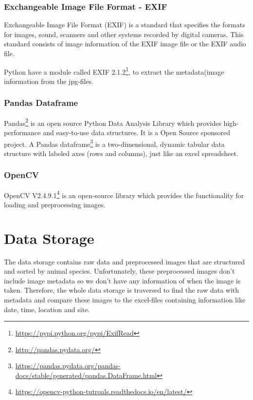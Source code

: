 \documentclass[USenglish]{uit-thesis}
\begin{document}
\subsubsection{Exchangeable Image File Format - EXIF} \label{sssec:imp_exif}
Exchangeable Image File Format (EXIF) is a standard that specifies the formats for images, sound, scanners and other systems recorded by digital cameras. This standard consists of image information of the EXIF image file or the EXIF audio file.

Python have a module called  EXIF 2.1.2\footnote{\url{https://pypi.python.org/pypi/ExifRead}}, to extract the metadata(image information from the jpg-files.

\subsubsection{Pandas Dataframe} \label{sssec:imp_df}
Pandas\footnote{\url{http://pandas.pydata.org/}} is an open source Python Data Analysis Library which provides high-performance and easy-to-use data structures. It is a Open Source sponsored project. A Pandas dataframe\footnote{\url{https://pandas.pydata.org/pandas-docs/stable/generated/pandas.DataFrame.html}} is a two-dimensional, dynamic tabular data structure with labeled axes (rows and columns), just like an excel spreadsheet.

\subsubsection{OpenCV} \label{sssec:imp_cv}
OpenCV V2.4.9.1\footnote{\url{https://opencv-python-tutroals.readthedocs.io/en/latest/}} is an open-source library which provides the functionality for loading and preprocessing images.



\section{Data Storage} \label{sec:imp_storage}
The data storage contains raw data and preprocessed images that are structured and sorted by animal species. Unfortunately, these preprocessed images don't include image metadata so we don't have any information of when the image is taken. Therefore, the whole data storage is traversed to find the raw data with metadata and compare these images to the excel-files containing information like date, time, location and site.
\end{document}
